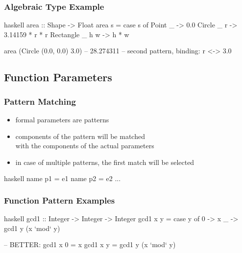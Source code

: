 \documentclass[dvipsnames]{beamer}
\theoremstyle{plain}
\begin{document}
\begin{frame}[fragile]
  \frametitle{Algebraic Type Example}

  \begin{exampleblock}{}
    \begin{pygments}{haskell}
area :: Shape -> Float
area s =
    case s of
      Point _ -> 0.0
      Circle _ r -> 3.14159 * r * r
      Rectangle _ h w -> h * w

area (Circle (0.0, 0.0) 3.0)  -- 28.274311
-- second pattern, binding: r <-> 3.0
    \end{pygments}
  \end{exampleblock}
\end{frame}

\subsection{Function Parameters}

\begin{frame}[fragile]
  \frametitle{Pattern Matching}

  \begin{itemize}
    \item formal parameters are patterns
    \item components of the pattern will be matched\\
      with the components of the actual parameters
    \item in case of multiple patterns, the first match will be selected
  \end{itemize}

  \begin{block}{}
    \begin{pygments}{haskell}
name p1 = e1
name p2 = e2
...
    \end{pygments}
  \end{block}
\end{frame}

\begin{frame}[fragile]
  \frametitle{Function Pattern Examples}

  \begin{exampleblock}{}
    \begin{pygments}{haskell}
gcd1 :: Integer -> Integer -> Integer
gcd1 x y =
    case y of
      0 -> x
      _ -> gcd1 y (x `mod` y)

-- BETTER:
gcd1 x 0 = x
gcd1 x y = gcd1 y (x `mod` y)
    \end{pygments}
  \end{exampleblock}
\end{frame}
\end{document}
